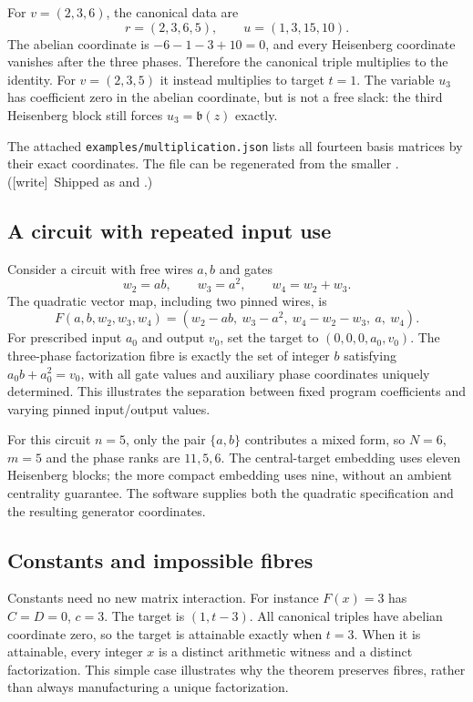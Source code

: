 \documentclass[11pt,letterpaper]{article}
\theoremstyle{definition}
\theoremstyle{remark}
\newcommand{\bn}{\mathfrak b}
\newcommand{\wtag}{\textup{[write]}}
\begin{document}
For $v=(2,3,6)$, the canonical data are
\[
                 r=(2,3,6,5),\qquad u=(1,3,15,10).
\]
The abelian coordinate is $-6-1-3+10=0$, and every Heisenberg coordinate
vanishes after the three phases. Therefore the canonical triple multiplies
to the identity. For $v=(2,3,5)$ it instead multiplies to target $t=1$.
The variable $u_3$ has coefficient zero in the abelian coordinate, but is
not a free slack: the third Heisenberg block still forces
$u_3=\bn(z)$ exactly.

The attached \texttt{examples/multiplication.json} lists all fourteen
basis matrices by their exact coordinates. The file can be regenerated
from the smaller . (\wtag\ Shipped as  and .)

\subsection{A circuit with repeated input use}
Consider a circuit with free wires $a,b$ and gates
\[
                 w_2=ab,\qquad w_3=a^2,\qquad w_4=w_2+w_3.
\]
The quadratic vector map, including two pinned wires, is
\[
 F(a,b,w_2,w_3,w_4)
   =(w_2-ab,\ w_3-a^2,\ w_4-w_2-w_3,\ a,\ w_4).
\]
For prescribed input $a_0$ and output $v_0$, set the target to
$(0,0,0,a_0,v_0)$. The three-phase factorization fibre is exactly the set of
integer $b$ satisfying $a_0b+a_0^2=v_0$, with all gate values and auxiliary
phase coordinates uniquely determined. This illustrates the separation
between fixed program coefficients and varying pinned input/output values.

For this circuit $n=5$, only the pair $\{a,b\}$ contributes a mixed form,
so $N=6$, $m=5$ and the phase ranks are $11,5,6$. The central-target
embedding uses eleven Heisenberg blocks; the more compact embedding uses
nine, without an ambient centrality guarantee. The software supplies both
the quadratic specification and the resulting generator coordinates.

\subsection{Constants and impossible fibres}
Constants need no new matrix interaction. For instance $F(x)=3$ has
$C=D=0$, $c=3$. The target is $(1,t-3)$. All canonical triples have abelian
coordinate zero, so the target is attainable exactly when $t=3$. When it
is attainable, every integer $x$ is a distinct arithmetic witness and a
distinct factorization. This simple case illustrates why the theorem
preserves fibres, rather than always manufacturing a unique factorization.
\end{document}
